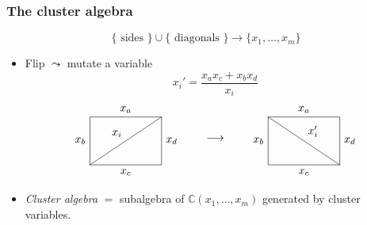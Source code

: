 \documentclass[aspectratio=169]{beamer}
\begin{document}
\begin{frame}
	\frametitle{The cluster algebra}

	\begin{equation*}
		\{\text{ sides }\} \cup \{ \text{ diagonals }\} \longrightarrow \{x_1, \dotsc, x_m\}
	\end{equation*}
	\pause
	\begin{itemize}
		\item Flip $\leadsto$ mutate a variable\pause
		      \begin{equation*}
			      x_i' = \frac{x_a x_c + x_b x_d}{x_i}
		      \end{equation*}
		      \begin{equation*}
			      \begin{tikzpicture}[baseline]
				      \node[name=r, draw, inner sep = 5ex, xscale = 1.5]     {};
				      \node[above] at  (r.north) {$x_a$};
				      \node[left]  at  (r.west) {$x_b$};
				      \node[below] at  (r.south) {$x_c$};
				      \node[right] at  (r.east) {$x_d$};
				      \draw (r.south west) edge["$x_i$"] (r.north east);
			      \end{tikzpicture}
			      \qquad\longrightarrow\qquad
			      \begin{tikzpicture}[baseline]
				      \node[name=r, draw, inner sep = 5ex, xscale = 1.5]        {};
				      \node[above] at  (r.north) {$x_a$};
				      \node[left]  at  (r.west) {$x_b$};
				      \node[below] at  (r.south) {$x_c$};
				      \node[right] at  (r.east) {$x_d$};
				      \draw (r.north west) edge["$x_i'$"] (r.south east);
			      \end{tikzpicture}
		      \end{equation*}
		      \pause
		\item \emph{Cluster algebra} $=$ subalgebra of $\mathbb{C}(x_1, \dotsc, x_m)$ generated by cluster variables.
	\end{itemize}

\end{frame}
\end{document}
